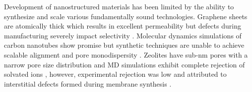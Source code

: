 Development of nanostructured materials has been limited by the ability
to synthesize and scale various fundamentally sound technologies.
Graphene sheets are atomically thick which results in excellent permeability
but defects during manufacturing severely impact selectivity 
\cite{cohen-tanugi_multilayer_2016}. Molecular dynamics simulations of
carbon nanotubes show promise \cite{humplik_nanostructured_2011} but 
synthetic techniques are unable to achieve scalable alignment and pore
monodispersity \cite{hata_water-assisted_2004,maruyama_growth_2005}.
Zeolites have sub-nm pores with a narrow pore size distribution and MD simulations
exhibit complete rejection of solvated ions \cite{murad_molecular_1998},
however, experimental rejection was low and attributed to interstitial
defects formed during membrane synthesis \cite{li_desalination_2004}.

